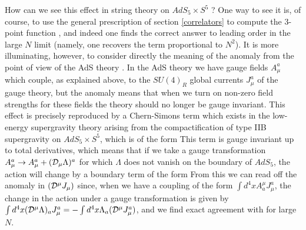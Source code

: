 How can we see this effect in string theory on $AdS_5\times S^5$ ? One
way to see it is, of course, to use the general prescription of
section \ref{correlators} 
to compute the 3-point function , and indeed
one finds \cite{Freedman:1998tz,Chalmers:1998xr} 
the correct answer to leading order in the large $N$
limit (namely, one recovers the term proportional to $N^2$). It is more
illuminating, however, to consider directly the meaning of the anomaly
 from the point of view of the AdS theory 
\cite{Witten:1998qj}. In the AdS
theory we have gauge fields $A_\mu^a$ which couple, as explained
above, to the $SU(4)_R$ global currents $J_\mu^a$ of the gauge theory,
but the anomaly means that when we turn on non-zero field strengths
for these fields the theory should no longer be gauge invariant. This
effect is precisely reproduced by a Chern-Simons term which exists in
the low-energy supergravity theory arising from the compactification
of type IIB supergravity on $AdS_5\times S^5$, which is of the form
This term is gauge invariant up to total derivatives,
which means that if we take a gauge transformation $A_\mu^a \to
A_\mu^a + ({\cal D}_\mu \Lambda)^a$ for which $\Lambda$ does not
vanish on the boundary of $AdS_5$, the action will change by a
boundary term of the form
{}From this we can read off the anomaly in $({\cal D}^\mu J_{\mu})$
since, when we have a coupling of the form $\int d^4x A^\mu_a
J_\mu^a$, the change in the action under a gauge transformation is
given by $\int d^4x ({\cal D}^\mu \Lambda)_a J_\mu^a = -\int d^4x
\Lambda_a ({\cal D}^\mu J_\mu^a)$, and we find exact agreement with
 for large $N$.

